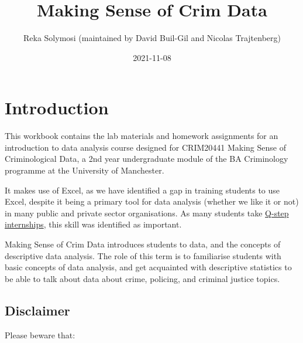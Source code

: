 \documentclass[
]{book}
\title{Making Sense of Crim Data}
\author{Reka Solymosi (maintained by David Buil-Gil and Nicolas Trajtenberg)}
\date{2021-11-08}
\begin{document}
\maketitle

{
\setcounter{tocdepth}{1}
\tableofcontents
}
\hypertarget{introduction}{%
\chapter*{Introduction}\label{introduction}}

This workbook contains the lab materials and homework assignments for an introduction to data analysis course designed for CRIM20441 Making Sense of Criminological Data, a 2nd year undergraduate module of the BA Criminology programme at the University of Manchester.

It makes use of Excel, as we have identified a gap in training students to use Excel, despite it being a primary tool for data analysis (whether we like it or not) in many public and private sector organisations. As many students take \href{https://www.humanities.manchester.ac.uk/q-step/}{Q-step internships}, this skill was identified as important.

Making Sense of Crim Data introduces students to data, and the concepts of descriptive data analysis. The role of this term is to familiarise students with basic concepts of data analysis, and get acquainted with descriptive statistics to be able to talk about data about crime, policing, and criminal justice topics.

\hypertarget{disclaimer}{%
\section*{Disclaimer}\label{disclaimer}}

Please beware that:
\end{document}
